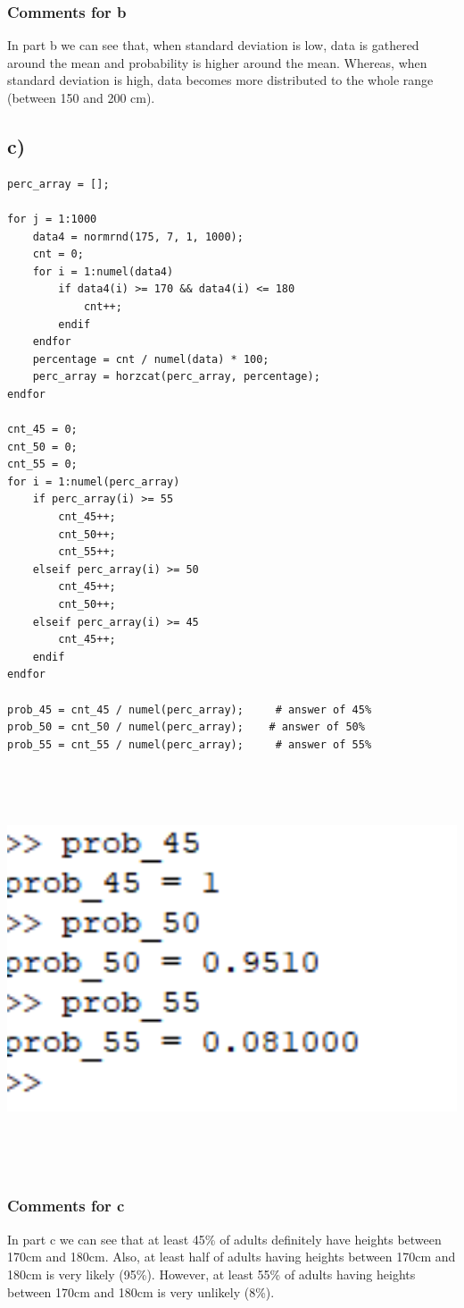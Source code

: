 \documentclass[12pt]{article}
\begin{document}
\subsubsection*{Comments for b}
In part b we can see that, when standard deviation is low, data is gathered around the mean and probability is higher around the mean. Whereas, when standard deviation is high, data becomes more distributed to the whole range (between 150 and 200 cm).


\subsection*{c)} 
\begin{Verbatim}[tabsize=4]
perc_array = [];

for j = 1:1000
	data4 = normrnd(175, 7, 1, 1000);
	cnt = 0;
	for i = 1:numel(data4)
		if data4(i) >= 170 && data4(i) <= 180
			cnt++;
		endif
	endfor
	percentage = cnt / numel(data) * 100;
	perc_array = horzcat(perc_array, percentage);
endfor

cnt_45 = 0;
cnt_50 = 0;
cnt_55 = 0;
for i = 1:numel(perc_array)
	if perc_array(i) >= 55
		cnt_45++;
		cnt_50++;
		cnt_55++;
	elseif perc_array(i) >= 50
		cnt_45++;
		cnt_50++;
	elseif perc_array(i) >= 45
		cnt_45++;
	endif
endfor

prob_45 = cnt_45 / numel(perc_array);     # answer of 45%
prob_50 = cnt_50 / numel(perc_array);	 # answer of 50%
prob_55 = cnt_55 / numel(perc_array);     # answer of 55%
\end{Verbatim}

\includegraphics[width=16cm, height=12cm]{c.png} 

\subsubsection*{Comments for c}
In part c we can see that at least 45\% of adults definitely have heights between 170cm and 180cm. Also, at least half of adults having heights between 170cm and 180cm is very likely (95\%). However, at least 55\% of adults having heights between 170cm and 180cm is very unlikely (8\%).
\end{document}
